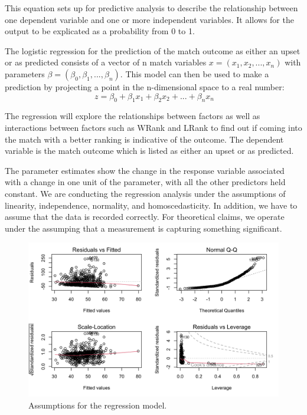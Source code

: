 \documentclass[12pt]{article}
\begin{document}
This equation sets up for predictive analysis to describe the relationship between 
one dependent variable and one or more independent variables. It allows for the output 
to be explicated as a probability from 0 to 1.
  
The logistic regression for the prediction of the match outcome as either an upset or as predicted 
consists of a vector of n match variables $x = (x_1, x_2,..., x_n)$ with parameters $\beta = (\beta_0,
\beta_1,...,\beta_n)$. This model can then be used to make a prediction by projecting a point in 
the n-dimensional space to a real number:
\begin{equation}
  \label{eq:logreg}
    \ z = \beta_0 + \beta_1 x_1 + \beta_2 x_2 + ... + \beta_nx_n
\end{equation}

The regression will explore the relationships between factors as well as interactions 
between factors such as WRank and LRank to find out if coming into the match with a 
better ranking is indicative of the outcome. The dependent variable is the match outcome 
which is listed as either an upset or as predicted.

The parameter estimates show the change in the response variable associated with a change in one 
unit of the parameter, with all the other predictors held constant. We are conducting the regression 
analysis under the assumptions of linearity, independence, normality, and homoscedasticity. In 
addition, we have to assume that the data is recorded correctly. For theoretical claims, we operate 
under the assumping that a measurement is capturing something significant.

\begin{figure} [htbp]
  \centering
  \includegraphics[width=\textwidth, scale=0.5]{assumptions.pdf}
  \caption{Assumptions for the regression model.}
 \label{fig:assumptions}
\end{figure}
\end{document}
